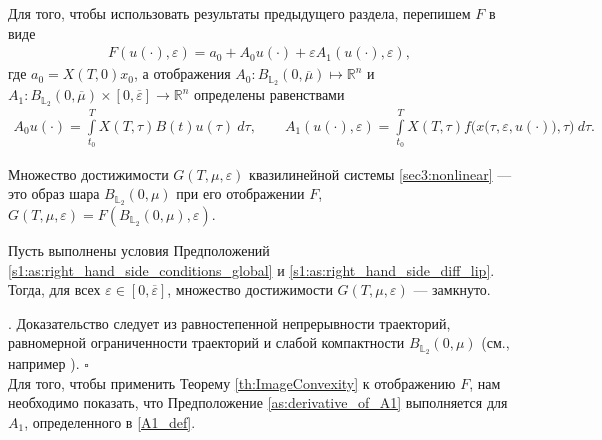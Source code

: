 \documentclass[../main.tex]{subfiles}
\begin{document}
Для того, чтобы использовать результаты предыдущего раздела, перепишем $F$ в виде
\begin{gather*}
 F(u(\cdot),\varepsilon) = a_0 + A_0 u(\cdot) + \varepsilon A_1(u(\cdot), \varepsilon), 
\end{gather*}
где $a_0 = X(T,0)x_0 $, а отображения $A_0: B_{\mathbb{L}_2}(0,\overline{\mu}) \mapsto \mathbb{R}^n$ и $A_1: B_{\mathbb{L}_2}(0,\overline{\mu}) \times [0,\overline{\varepsilon}] \to \mathbb{R}^n$ определены равенствами
\begin{gather}\label{A1_def}
 A_0 u(\cdot) = \int\limits_{t_0}^T X(T,\tau) B(t)u(\tau)\ d\tau, \qquad
 A_1(u(\cdot),\varepsilon) = \int\limits_{t_0}^T X(T,\tau) f\Big(x\big(\tau,\varepsilon, u(\cdot)\big),\tau\Big) \ d\tau.
\end{gather}

Множество достижимости $G(T,\mu,\varepsilon) $ квазилинейной системы \eqref{sec3:nonlinear} --- это образ шара $B_{\mathbb{L}_2}(0,\mu)$ при его отображении $F$, $G(T,\mu,\varepsilon) = F(B_{\mathbb{L}_2}(0,\mu),\varepsilon)$.

\begin{utv}\label{ReachableSetcloseness}
 Пусть выполнены условия Предположений \ref{s1:as:right_hand_side_conditions_global} и \ref{s1:as:right_hand_side_diff_lip}. 
Тогда, для всех $\varepsilon\in [0,\overline{\varepsilon}]$, множество достижимости $G(T,\mu,\varepsilon) $ --- замкнуто.
\end{utv}
\doc. 
Доказательство следует из равностепенной непрерывности траекторий, равномерной ограниченности траекторий и слабой компактности $B_{\mathbb{L}_2}(0,\mu)$ (см., например \cite{GusZyk}).
\hfill$\square$\\[1ex]%

Для того, чтобы применить Теорему \ref{th:ImageConvexity} к отображению $F$, нам необходимо показать, что Предположение \ref{as:derivative_of_A1} выполняется для $A_1$, определенного в \eqref{A1_def}.
\end{document}
